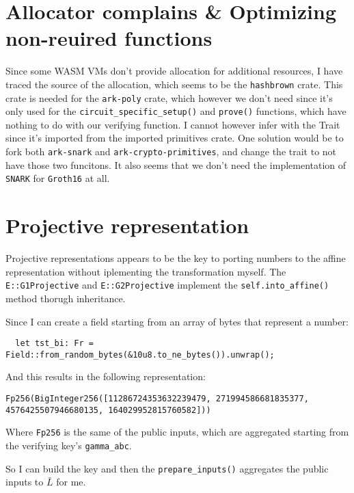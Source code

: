 \documentclass{article}
\newcommand{\inl}[1]{\lstinline{#1}}
\begin{document}
\section{Allocator complains \& Optimizing non-reuired functions}
Since some WASM VMs don't provide allocation for additional resources, I have traced the source of the allocation, which seems to be the \lstinline{hashbrown} crate. This crate is needed for the \lstinline{ark-poly} crate, which however we don't need since it's only used for the \lstinline{circuit_specific_setup()} and \lstinline{prove()} functions, which have nothing to do with our verifying function. I cannot however infer with the Trait since it's imported from the imported primitives crate. One solution would be to fork both \inl{ark-snark} and \inl{ark-crypto-primitives}, and change the trait to not have those two funcitons. It also seems that we don't need the implementation of \inl{SNARK} for \inl{Groth16} at all.


\section{Projective representation}
Projective representations appears to be the key to porting numbers to the affine representation without iplementing the transformation myself. The \inl{E::G1Projective} and \inl{E::G2Projective} implement the \inl{self.into_affine()} method thorugh inheritance.

Since I can create a field starting from an array of bytes that represent a number:
\begin{lstlisting}
  let tst_bi: Fr = Field::from_random_bytes(&10u8.to_ne_bytes()).unwrap();
\end{lstlisting}

And this results in the following representation:

\begin{lstlisting}
Fp256(BigInteger256([11286724353632239479, 271994586681835377, 4576425507946680135, 164029952815760582]))
\end{lstlisting}

Where \inl{Fp256} is the same of the public inputs, which are aggregated starting from the verifying key's \inl{gamma_abc}.

So I can build the key and then the \inl{prepare_inputs()} aggregates the public inputs to \( \bar{L} \) for me.
\end{document}
